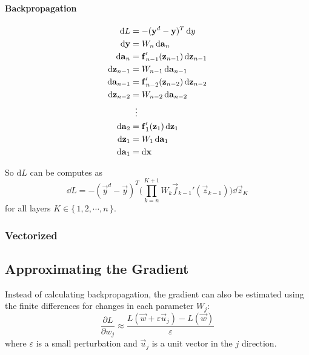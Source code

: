 			\paragraph{Backpropagation} %
				\begin{align}
					\dd{L} &= -(\boldsymbol{\mathrm{y}}^d - \boldsymbol{\mathrm{y}})^T \dd{y} \\
					\dd{\boldsymbol{\mathrm{y}}} &= W_n \dd{\boldsymbol{\mathrm{a}}_n} \\
					\dd{\boldsymbol{\mathrm{a}}_n} &= \boldsymbol{\mathrm{f}}_{n - 1}' (\boldsymbol{\mathrm{z}}_{n - 1}) \dd{\boldsymbol{\mathrm{z}}_{n - 1}} \\
					\dd{\boldsymbol{\mathrm{z}}_{n - 1}} &= W_{n - 1} \dd{\boldsymbol{\mathrm{a}}_{n - 1}} \\
					\dd{\boldsymbol{\mathrm{a}}_{n - 1}} &= \boldsymbol{\mathrm{f}}_{n - 2}' (\boldsymbol{\mathrm{z}}_{n - 2}) \dd{\boldsymbol{\mathrm{z}}_{n - 2}} \\
					\dd{\boldsymbol{\mathrm{z}}_{n - 2}} &= W_{n - 2} \dd{\boldsymbol{\mathrm{a}}_{n - 2}} \\
					&\hspace{0.2cm}\vdots \\
					\dd{\boldsymbol{\mathrm{a}}_2} &= \boldsymbol{\mathrm{f}}_1' (\boldsymbol{\mathrm{z}}_1) \dd{\boldsymbol{\mathrm{z}}_1} \\
					\dd{\boldsymbol{\mathrm{z}}_1} &= W_1 \dd{\boldsymbol{\mathrm{a}}_1} \\
					\dd{\boldsymbol{\mathrm{a}}_1} &= \textrm{d}\boldsymbol{\mathrm{x}}
				\end{align}
				
				So \( \textrm{d}L \) can be computes as
				\begin{equation}
					\dd{L} = -(\vec{y}^d - \vec{y})^T \Bigg( \prod_{k = n}^{K + 1} W_k \vec{f}_{k - 1}' (\vec{z}_{k - 1}) \Bigg) \dd{\vec{z}_K}
				\end{equation}
				for all layers \( K \in \{\, 1, 2, \cdots, n \,\} \).

			\subsubsection{Vectorized} %

		\subsection{Approximating the Gradient}
			Instead of calculating backpropagation, the gradient can also be estimated using the finite differences for changes in each parameter \( W_j \):
			\begin{equation}
				\frac{\partial L}{\partial w_j} \approx \frac{L(\vec{w} + \varepsilon \vec{u}_j) - L(\vec{w})}{\varepsilon}
			\end{equation}
			where \(\varepsilon\) is a small perturbation and \(\vec{u}_j\) is a unit vector in the \(j\) direction.
			

